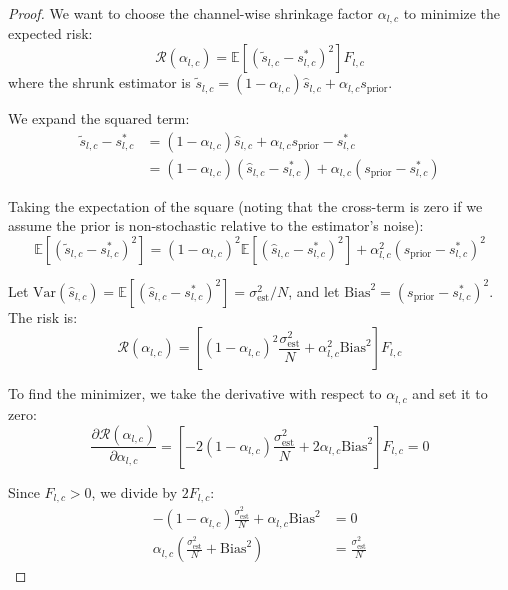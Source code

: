 \documentclass{article}
\theoremstyle{plain}
\theoremstyle{definition}
\theoremstyle{remark}
\begin{document}
\begin{proof}
We want to choose the channel-wise shrinkage factor $\alpha_{l,c}$ to minimize the expected risk:
\begin{equation}
    \mathcal{R}(\alpha_{l,c}) = \mathbb{E}\left[ (\tilde{s}_{l,c} - s^*_{l,c})^2 \right] F_{l,c}
\end{equation}
where the shrunk estimator is $\tilde{s}_{l,c} = (1 - \alpha_{l,c})\hat{s}_{l,c} + \alpha_{l,c} s_{\text{prior}}$.

We expand the squared term:
\begin{align}
    \tilde{s}_{l,c} - s^*_{l,c} &= (1 - \alpha_{l,c})\hat{s}_{l,c} + \alpha_{l,c} s_{\text{prior}} - s^*_{l,c} \\
    &= (1 - \alpha_{l,c})(\hat{s}_{l,c} - s^*_{l,c}) + \alpha_{l,c}(s_{\text{prior}} - s^*_{l,c})
\end{align}

Taking the expectation of the square (noting that the cross-term is zero if we assume the prior is non-stochastic relative to the estimator's noise):
\begin{equation}
    \mathbb{E}\left[ (\tilde{s}_{l,c} - s^*_{l,c})^2 \right] = (1 - \alpha_{l,c})^2 \mathbb{E}\left[ (\hat{s}_{l,c} - s^*_{l,c})^2 \right] + \alpha_{l,c}^2 (s_{\text{prior}} - s^*_{l,c})^2
\end{equation}

Let $\text{Var}(\hat{s}_{l,c}) = \mathbb{E}\left[ (\hat{s}_{l,c} - s^*_{l,c})^2 \right] = \sigma^2_{\text{est}} / N$, and let $\text{Bias}^2 = (s_{\text{prior}} - s^*_{l,c})^2$. The risk is:
\begin{equation}
    \mathcal{R}(\alpha_{l,c}) = \left[ (1 - \alpha_{l,c})^2 \frac{\sigma^2_{\text{est}}}{N} + \alpha_{l,c}^2 \text{Bias}^2 \right] F_{l,c}
\end{equation}

To find the minimizer, we take the derivative with respect to $\alpha_{l,c}$ and set it to zero:
\begin{equation}
    \frac{\partial \mathcal{R}(\alpha_{l,c})}{\partial \alpha_{l,c}} = \left[ -2(1 - \alpha_{l,c}) \frac{\sigma^2_{\text{est}}}{N} + 2\alpha_{l,c} \text{Bias}^2 \right] F_{l,c} = 0
\end{equation}

Since $F_{l,c} > 0$, we divide by $2 F_{l,c}$:
\begin{align}
    -(1 - \alpha_{l,c}) \frac{\sigma^2_{\text{est}}}{N} + \alpha_{l,c} \text{Bias}^2 &= 0 \\
    \alpha_{l,c} \left( \frac{\sigma^2_{\text{est}}}{N} + \text{Bias}^2 \right) &= \frac{\sigma^2_{\text{est}}}{N}
\end{align}


\end{proof}
\end{document}
